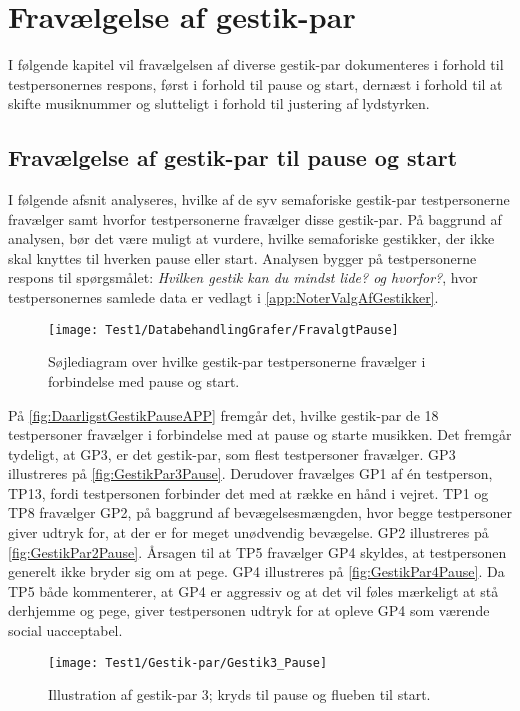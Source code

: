 \chapter{Fravælgelse af gestik-par}
\label{app:TestresultaterFravaelgelse}
%
I følgende kapitel vil fravælgelsen af diverse gestik-par dokumenteres i forhold til testpersonernes respons, først i forhold til pause og start, dernæst i forhold til at skifte musiknummer og slutteligt i forhold til justering af lydstyrken. 
%
\section{Fravælgelse af gestik-par til pause og start}
\label{app:TestresultaterPauseDaarlig} 
%
I følgende afsnit analyseres, hvilke af de syv semaforiske gestik-par testpersonerne fravælger samt hvorfor testpersonerne fravælger disse gestik-par. På baggrund af analysen, bør det være muligt at vurdere, hvilke semaforiske gestikker, der ikke skal knyttes til hverken pause eller start. Analysen bygger på testpersonerne respons til spørgsmålet: \textit{Hvilken gestik kan du mindst lide? og hvorfor?}, hvor testpersonernes samlede data er vedlagt i \autoref{app:NoterValgAfGestikker}.
%
\begin{figure}[H]
	\centering
	\texttt{[image: Test1/DatabehandlingGrafer/FravalgtPause]}
	\caption{Søjlediagram over hvilke gestik-par testpersonerne fravælger i forbindelse med pause og start.}
	\label{fig:DaarligstGestikPauseAPP}
\end{figure}
\noindent
% 
På \autoref{fig:DaarligstGestikPauseAPP} fremgår det, hvilke gestik-par de 18 testpersoner fravælger i forbindelse med at pause og starte musikken. Det fremgår tydeligt, at GP3, er det gestik-par, som flest testpersoner fravælger. GP3 illustreres på \autoref{fig:GestikPar3Pause}. Derudover fravælges GP1 af én testperson, TP13, fordi testpersonen forbinder det med at række en hånd i vejret. TP1 og TP8 fravælger GP2, på baggrund af bevægelsesmængden, hvor begge testpersoner giver udtryk for, at der er for meget unødvendig bevægelse. GP2 illustreres på \autoref{fig:GestikPar2Pause}. Årsagen til at TP5 fravælger GP4 skyldes, at testpersonen generelt ikke bryder sig om at pege. GP4 illustreres på \autoref{fig:GestikPar4Pause}. Da TP5 både kommenterer, at GP4 er aggressiv og at det vil føles mærkeligt at stå derhjemme og pege, giver testpersonen udtryk for at opleve GP4 som værende social uacceptabel. 
%
\begin{figure}[H]
	\centering
	\texttt{[image: Test1/Gestik-par/Gestik3\_Pause]}
	\caption{Illustration af gestik-par 3; kryds til pause og flueben til start.}
	\label{fig:GestikPar3Pause}
\end{figure}
